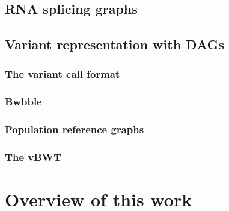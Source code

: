 
\subsection{RNA splicing graphs}

\subsection{Variant representation with DAGs}

\subsubsection{The variant call format}

\subsubsection{Bwbble}

\subsubsection{Population reference graphs}

\subsubsection{The vBWT}

\section{Overview of this work}

 
